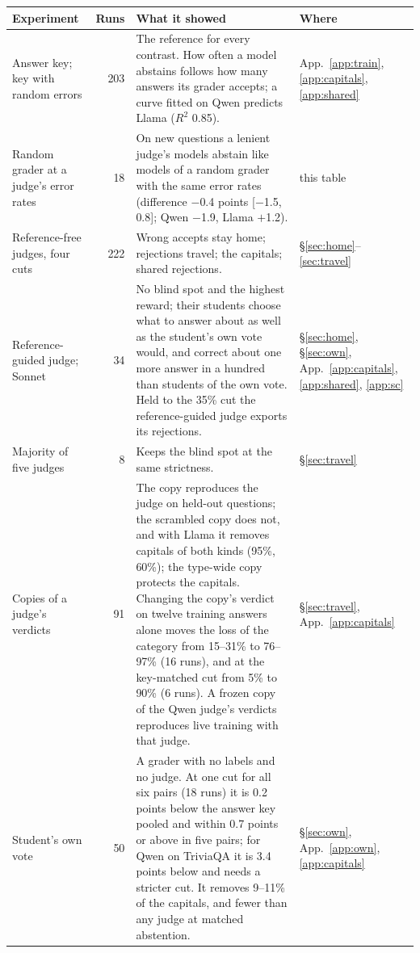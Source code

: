 \begin{table}[p]
\footnotesize
\centering
\begin{tabular}{@{}p{}rp{}p{}@{}}
\toprule
Experiment & Runs & What it showed & Where \\
\midrule
Answer key; key with random errors & 203 & The reference for every contrast. How often a model abstains follows how many answers its grader accepts; a curve fitted on Qwen predicts Llama ($R^2$ 0.85). & App.~\ref{app:train}, \ref{app:capitals}, \ref{app:shared} \\
Random grader at a judge's error rates & 18 & On new questions a lenient judge's models abstain like models of a random grader with the same error rates (difference $-$0.4 points [$-$1.5, 0.8]; Qwen $-$1.9, Llama $+$1.2). & this table \\
Reference-free judges, four cuts & 222 & Wrong accepts stay home; rejections travel; the capitals; shared rejections. & \S\ref{sec:home}--\ref{sec:travel} \\
Reference-guided judge; Sonnet & 34 & No blind spot and the highest reward; their students choose what to answer about as well as the student's own vote would, and correct about one more answer in a hundred than students of the own vote. Held to the 35\% cut the reference-guided judge exports its rejections. & \S\ref{sec:home}, \S\ref{sec:own}, App.~\ref{app:capitals}, \ref{app:shared}, \ref{app:sc} \\
Majority of five judges & 8 & Keeps the blind spot at the same strictness. & \S\ref{sec:travel} \\
Copies of a judge's verdicts & 91 & The copy reproduces the judge on held-out questions; the scrambled copy does not, and with Llama it removes capitals of both kinds (95\%, 60\%); the type-wide copy protects the capitals. Changing the copy's verdict on twelve training answers alone moves the loss of the category from 15--31\% to 76--97\% (16 runs), and at the key-matched cut from 5\% to 90\% (6 runs). A frozen copy of the Qwen judge's verdicts reproduces live training with that judge. & \S\ref{sec:travel}, App.~\ref{app:capitals} \\
Student's own vote & 50 & A grader with no labels and no judge. At one cut for all six pairs (18 runs) it is 0.2 points below the answer key pooled and within 0.7 points or above in five pairs; for Qwen on TriviaQA it is 3.4 points below and needs a stricter cut. It removes 9--11\% of the capitals, and fewer than any judge at matched abstention. & \S\ref{sec:own}, App.~\ref{app:own}, \ref{app:capitals} \\

\end{tabular}
\end{table}
